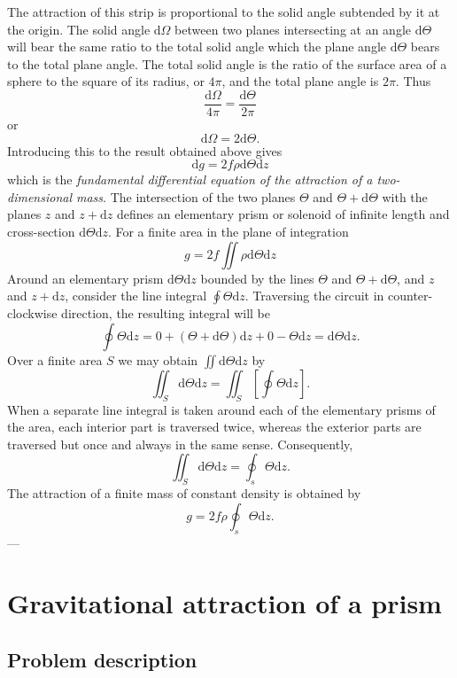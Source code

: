 \documentclass[
  a4paper,
  DIV=11,
  numbers=noendperiod]{scrreprt}
\begin{document}
The attraction of this strip is proportional to the solid angle
subtended by it at the origin. The solid angle \(\mathrm{d}\Omega\)
between two planes intersecting at an angle \(\mathrm{d}\Theta\) will
bear the same ratio to the total solid angle which the plane angle
\(\mathrm{d}\Theta\) bears to the total plane angle. The total solid
angle is the ratio of the surface area of a sphere to the square of its
radius, or \(4 \pi\), and the total plane angle is \(2 \pi\). Thus \[
\frac{\mathrm{d}\Omega}{4 \pi} = \frac{\mathrm{d}\Theta}{2 \pi}
\] or \[
\mathrm{d}\Omega = 2 \mathrm{d}\Theta.
\] Introducing this to the result obtained above gives \[
\mathrm{d}g = 2 f \rho \mathrm{d}\Theta \mathrm{d}z
\] which is the \emph{fundamental differential equation of the
attraction of a two-dimensional mass}. The intersection of the two
planes \(\Theta\) and \(\Theta + \mathrm{d}\Theta\) with the planes
\(z\) and \(z+\mathrm{d}z\) defines an elementary prism or solenoid of
infinite length and cross-section \(\mathrm{d}\Theta\mathrm{d}z\). For a
finite area in the plane of integration \[
g = 2 f \iint \rho \mathrm{d}\Theta \mathrm{d}z
\] Around an elementary prism \(\mathrm{d}\Theta\mathrm{d}z\) bounded by
the lines \(\Theta\) and \(\Theta + \mathrm{d}\Theta\), and \(z\) and
\(z+\mathrm{d}z\), consider the line integral
\(\oint \Theta \mathrm{d}z\). Traversing the circuit in
counter-clockwise direction, the resulting integral will be \[
\oint \Theta \mathrm{d}z = 0 + (\Theta + \mathrm{d}\Theta)\mathrm{d}z + 0 - \Theta \mathrm{d}z = \mathrm{d}\Theta \mathrm{d}z.
\] Over a finite area \(S\) we may obtain
\(\iint \mathrm{d}\Theta \mathrm{d}z\) by \[
\iint_{S} \mathrm{d}\Theta \mathrm{d}z = \iint_{S} \left[\oint \Theta \mathrm{d}z \right].
\] When a separate line integral is taken around each of the elementary
prisms of the area, each interior part is traversed twice, whereas the
exterior parts are traversed but once and always in the same sense.
Consequently, \[
\iint_{S} \mathrm{d}\Theta \mathrm{d}z = \oint_{s} \Theta \mathrm{d}z.
\] The attraction of a finite mass of constant density is obtained by \[
g = 2 f \rho \oint_{s} \Theta \mathrm{d}z.
\] ---

\chapter{Gravitational attraction of a
prism}\label{gravitational-attraction-of-a-prism}

\section{Problem description}\label{problem-description}
\end{document}
